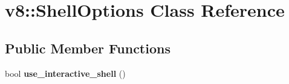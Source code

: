 \hypertarget{classv8_1_1_shell_options}{}\section{v8\+:\+:Shell\+Options Class Reference}
\label{classv8_1_1_shell_options}
\subsection*{Public Member Functions}
\begin{DoxyCompactItemize}
\item 
\hypertarget{classv8_1_1_shell_options_a2aa12d8d13dcbb90e0d509c58a3b5669}{}bool {\bfseries use\+\_\+interactive\+\_\+shell} ()\label{classv8_1_1_shell_options_a2aa12d8d13dcbb90e0d509c58a3b5669}

\end{DoxyCompactItemize}
